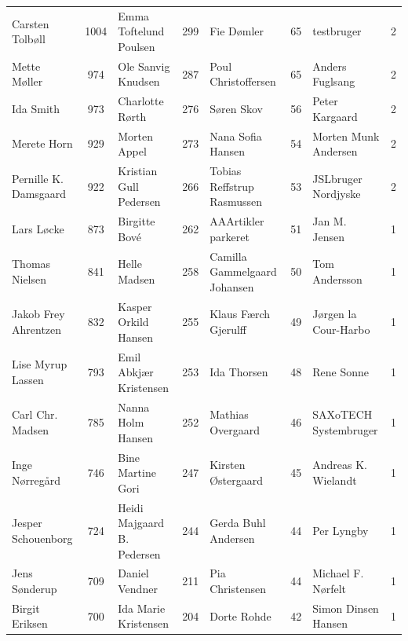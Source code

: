\begin{table}[h]
\begin{tabular}{l|c|l|c|l|c|l|c}
		Carsten Tolbøll       &  1004  & Emma Toftelund Poulsen     &  299   & Fie Dømler                   &   65   & testbruger                   &   2    \\
		Mette Møller          &  974   & Ole Sanvig Knudsen         &  287   & Poul Christoffersen          &   65   & Anders Fuglsang              &   2    \\
		Ida Smith             &  973   & Charlotte Rørth            &  276   & Søren Skov                   &   56   & Peter Kargaard               &   2    \\
		Merete Horn           &  929   & Morten Appel               &  273   & Nana Sofia Hansen            &   54   & Morten Munk Andersen         &   2    \\
		Pernille K. Damsgaard &  922   & Kristian Gull Pedersen     &  266   & Tobias Reffstrup Rasmussen   &   53   & JSLbruger Nordjyske          &   2    \\
		Lars Løcke            &  873   & Birgitte Bové              &  262   & AAArtikler parkeret          &   51   & Jan M. Jensen                &   1    \\
		Thomas Nielsen        &  841   & Helle Madsen               &  258   & Camilla Gammelgaard Johansen &   50   & Tom Andersson                &   1    \\
		Jakob Frey Ahrentzen  &  832   & Kasper Orkild Hansen       &  255   & Klaus Færch Gjerulff         &   49   & Jørgen la Cour-Harbo         &   1    \\
		Lise Myrup Lassen     &  793   & Emil Abkjær Kristensen     &  253   & Ida Thorsen                  &   48   & Rene Sonne                   &   1    \\
		Carl Chr. Madsen      &  785   & Nanna Holm Hansen          &  252   & Mathias Overgaard            &   46   & SAXoTECH Systembruger        &   1    \\
		Inge Nørregård        &  746   & Bine Martine Gori          &  247   & Kirsten Østergaard           &   45   & Andreas K. Wielandt          &   1    \\
		Jesper Schouenborg    &  724   & Heidi Majgaard B. Pedersen &  244   & Gerda Buhl Andersen          &   44   & Per Lyngby                   &   1    \\
		Jens Sønderup         &  709   & Daniel Vendner             &  211   & Pia Christensen              &   44   & Michael F. Nørfelt           &   1    \\
		Birgit Eriksen        &  700   & Ida Marie Kristensen       &  204   & Dorte Rohde                  &   42   & Simon Dinsen Hansen          &   1    \\

\end{tabular}
\end{table}
